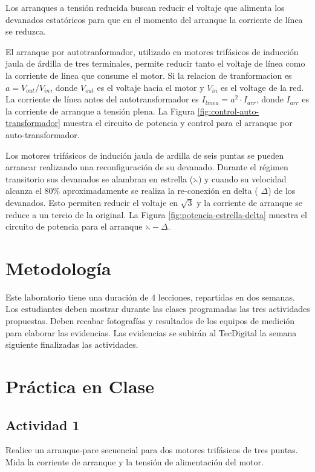 Los arranques a tensión reducida buscan reducir el voltaje que alimenta los devanados estatóricos para que en el momento del arranque la corriente de línea se reduzca.

El arranque por autotranformador, utilizado en motores trifásicos de inducción jaula de árdilla de tres terminales, permite reducir tanto el voltaje de línea como la corriente de linea que consume el motor. Si la relacion de tranformacion es $a=V_{out}/V_{in}$, donde $V_{out}$ es el voltaje hacia el motor y $V_{in}$ es el voltage de la red. La corriente de línea antes del autotransformador es $I_{linea} = a^{2}\cdot I_{arr}$, donde $I_{arr}$ es la corriente de arranque a tensión plena. La Figura \ref{fig:control-auto-transformador} muestra el circuito de potencia y control para el arranque por auto-transformador.

Los motores trifásicos de indución jaula de ardilla de seis puntas se pueden arrancar realizando una reconfiguración de su devanado. Durante el régimen transitorio  sus devanados se alambran en estrella ($\leftthreetimes$) y cuando su velocidad alcanza el 80\% aproximadamente se realiza la re-conexión en delta ( $\Delta$) de los devanados. Esto permiten reducir el voltaje en $\sqrt{3}$ y la corriente de arranque se reduce a un tercio de la original. La Figura \ref{fig:potencia-estrella-delta} muestra el circuito de potencia para el arranque $\leftthreetimes-\Delta$.

\section{Metodología}

Este laboratorio tiene una duración de 4 lecciones, repartidas en dos semanas. Los estudiantes deben mostrar durante las clases programadas las tres actividades propuestas. Deben recabar fotografías y resultados de los equipos de medición para elaborar las evidencias. Las evidencias se subirán al TecDigital la semana siguiente finalizadas las actividades.

\section{Práctica en Clase}

\subsection{Actividad 1}

Realice un arranque-pare secuencial para dos motores trifásicos de tres puntas. Mida la corriente de arranque y la tensión de alimentación del motor.

